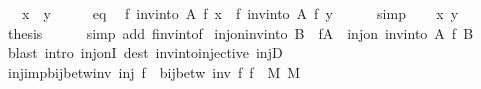 \begin{isabellebody}
\ \ \ {\isachardoublequoteopen}x\ {\isacharequal}{\kern0pt}\ y{\isachardoublequoteclose}\isanewline
%
\isadelimproof
%
\endisadelimproof
%
\isatagproof
{}\isamarkupfalse%
\ {\isacharminus}{\kern0pt}\isanewline
\ \ \isamarkupfalse%
\ eq\ \isamarkupfalse%
\ {\isachardoublequoteopen}f\ {\isacharparenleft}{\kern0pt}inv{\isacharunderscore}{\kern0pt}into\ A\ f\ x{\isacharparenright}{\kern0pt}\ {\isacharequal}{\kern0pt}\ f\ {\isacharparenleft}{\kern0pt}inv{\isacharunderscore}{\kern0pt}into\ A\ f\ y{\isacharparenright}{\kern0pt}{\isachardoublequoteclose}\isanewline
\ \ \ \ \isamarkupfalse%
\ simp\isanewline
\ \ \isamarkupfalse%
\ x\ y\ \isamarkupfalse%
\ {\isacharquery}{\kern0pt}thesis\isanewline
\ \ \ \ \isamarkupfalse%
\ {\isacharparenleft}{\kern0pt}simp\ add{\isacharcolon}{\kern0pt}\ f{\isacharunderscore}{\kern0pt}inv{\isacharunderscore}{\kern0pt}into{\isacharunderscore}{\kern0pt}f{\isacharparenright}{\kern0pt}\isanewline
{}\isamarkupfalse%
%
\endisatagproof
{\isafoldproof}%
%
\isadelimproof
\isanewline
%
\endisadelimproof
\isanewline
{}\isamarkupfalse%
\ inj{\isacharunderscore}{\kern0pt}on{\isacharunderscore}{\kern0pt}inv{\isacharunderscore}{\kern0pt}into{\isacharcolon}{\kern0pt}\ {\isachardoublequoteopen}B\ {\isasymsubseteq}\ f{\isacharbackquote}{\kern0pt}A\ {\isasymLongrightarrow}\ inj{\isacharunderscore}{\kern0pt}on\ {\isacharparenleft}{\kern0pt}inv{\isacharunderscore}{\kern0pt}into\ A\ f{\isacharparenright}{\kern0pt}\ B{\isachardoublequoteclose}\isanewline
%
\isadelimproof
\ \ %
\endisadelimproof
%
\isatagproof
{}\isamarkupfalse%
\ {\isacharparenleft}{\kern0pt}blast\ intro{\isacharcolon}{\kern0pt}\ inj{\isacharunderscore}{\kern0pt}onI\ dest{\isacharcolon}{\kern0pt}\ inv{\isacharunderscore}{\kern0pt}into{\isacharunderscore}{\kern0pt}injective\ injD{\isacharparenright}{\kern0pt}%
\endisatagproof
{\isafoldproof}%
%
\isadelimproof
\isanewline
%
\endisadelimproof
\isanewline
{}\isamarkupfalse%
\ inj{\isacharunderscore}{\kern0pt}imp{\isacharunderscore}{\kern0pt}bij{\isacharunderscore}{\kern0pt}betw{\isacharunderscore}{\kern0pt}inv{\isacharcolon}{\kern0pt}\ {\isachardoublequoteopen}inj\ f\ {\isasymLongrightarrow}\ bij{\isacharunderscore}{\kern0pt}betw\ {\isacharparenleft}{\kern0pt}inv\ f{\isacharparenright}{\kern0pt}\ {\isacharparenleft}{\kern0pt}f\ {\isacharbackquote}{\kern0pt}\ M{\isacharparenright}{\kern0pt}\ M{\isachardoublequoteclose}\isanewline
%
\isadelimproof
\ \ %

\end{isabellebody}
